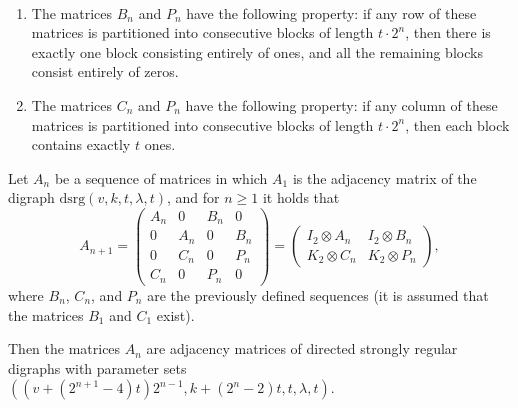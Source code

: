 \documentclass[10pt,a4paper]{amsart}
\begin{document}
\begin{lemma}$~$
\label{lemma:propsBnCnPn}
\begin{enumerate}
\item The matrices $B_n$ and $P_n$ have the following property: if any row of these matrices is partitioned into consecutive blocks of length $t\cdot 2^n$, then there is exactly one block consisting entirely of ones, and all the remaining blocks consist entirely of zeros.
\item The matrices $C_n$ and $P_n$ have the following property: if any column of these matrices is partitioned into consecutive blocks of length $t\cdot 2^n$, then each block contains exactly $t$ ones.
\end{enumerate}
\end{lemma}

\begin{theorem}
\label{th:main}
Let $A_n$ be a sequence of matrices in which $A_1$ is the adjacency matrix of the digraph $\text{dsrg}(v, k, t, \lambda, t)$, and for $n\geqslant 1$ it holds that
\begin{equation}
\label{eq:block_reprAnp1}
A_{n+1} = \left(
\begin{array}{cccc}
A_n & 0 & B_n & 0 \\
0 & A_n & 0 & B_n \\
0 & C_n & 0 & P_n \\
C_n & 0 & P_n & 0
\end{array}
\right)
= \left(
\begin{array}{cc}
I_2\otimes A_n & I_2\otimes B_n \\
K_2\otimes C_n & K_2\otimes P_n
\end{array}
\right)
,
\end{equation}
\noindent where $B_n$, $C_n$, and $P_n$ are the previously defined sequences (it is assumed that the matrices $B_1$ and $C_1$ exist).

Then the matrices $A_n$ are adjacency matrices of directed strongly regular digraphs with parameter sets~\mbox{$((v+(2^{n+1}-4)t)2^{n-1}, k+(2^n-2)t, t, \lambda, t)$}.
\end{theorem}
\end{document}
